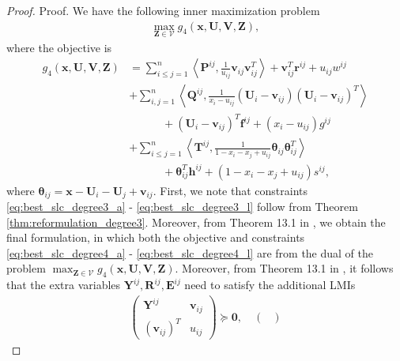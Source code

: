 \documentclass[opre,nonblindrev]{informs3} %
\begin{document}
\begin{proof}{Proof. }
We have the following inner maximization problem  
\begin{align*}
    \max_{\boldsymbol{Z} \in \mathcal{V}} g_4(\boldsymbol{x},\boldsymbol{U}, \boldsymbol{V},\boldsymbol{Z}),
\end{align*}
where the objective is
\begin{align*}
  g_4(\boldsymbol{x},\boldsymbol{U},\boldsymbol{V},\boldsymbol{Z}) &=  \sum_{i \le j=1}^n \left \langle \boldsymbol{P}^{ij}, \frac{1}{u_{ij}} \boldsymbol{v}_{ij} \boldsymbol{v}_{ij}^T \right \rangle + \boldsymbol{v}_{ij}^T \boldsymbol{r}^{ij} + u_{ij} w^{ij} \\ 
  &+ \sum_{i,j=1}^n \left \langle \boldsymbol{Q}^{ij}, \frac{1}{x_i-u_{ij}} \left(\boldsymbol{U}_i-\boldsymbol{v}_{ij} \right) \left( \boldsymbol{U}_i - \boldsymbol{v}_{ij} \right)^T \right \rangle \\ 
  &\quad \quad \quad + \left(\boldsymbol{U}_i-\boldsymbol{v}_{ij} \right)^T \boldsymbol{f}^{ij} + (x_i-u_{ij})g^{ij} \\ 
  &+ \sum_{i \le j=1}^n \left \langle \boldsymbol{T}^{ij}, \frac{1}{1-x_i-x_j+u_{ij}} \boldsymbol{\theta}_{ij} \boldsymbol{\theta}_{ij}^T \right \rangle \\ 
  &\quad \quad \quad + \boldsymbol{\theta}_{ij}^T \boldsymbol{h}^{ij} + (1-x_i-x_j+u_{ij})s^{ij},
\end{align*}  
where $\boldsymbol{\theta}_{ij} = \boldsymbol{x} - \boldsymbol{U}_i - \boldsymbol{U}_j + \boldsymbol{v}_{ij}$. First, we note that constraints \ref{eq:best_slc_degree3_a} - \ref{eq:best_slc_degree3_l} follow from Theorem \ref{thm:reformulation_degree3}. Moreover, from Theorem 13.1 in \cite{bertsimas22}, we obtain the final formulation, in which both the objective and constraints \ref{eq:best_slc_degree4_a} - \ref{eq:best_slc_degree4_l} are from the dual of the problem $\max_{\boldsymbol{Z} \in \mathcal{V}} g_4(\boldsymbol{x},\boldsymbol{U},\boldsymbol{V},\boldsymbol{Z})$. Moreover, from Theorem 13.1 in \cite{bertsimas22}, it follows that the extra variables $\boldsymbol{Y}^{ij}, \boldsymbol{R}^{ij}, \boldsymbol{E}^{ij}$ need to satisfy the additional LMIs 
\begin{align*}
    \begin{pmatrix}
                \boldsymbol{Y}^{ij} & \boldsymbol{v}_{ij} \\
                \left(\boldsymbol{v}_{ij}\right)^T & u_{ij}
           \end{pmatrix} \succeq \boldsymbol{0}, \quad  \begin{pmatrix}

\end{pmatrix}
\end{align*}
\end{proof}
\end{document}
